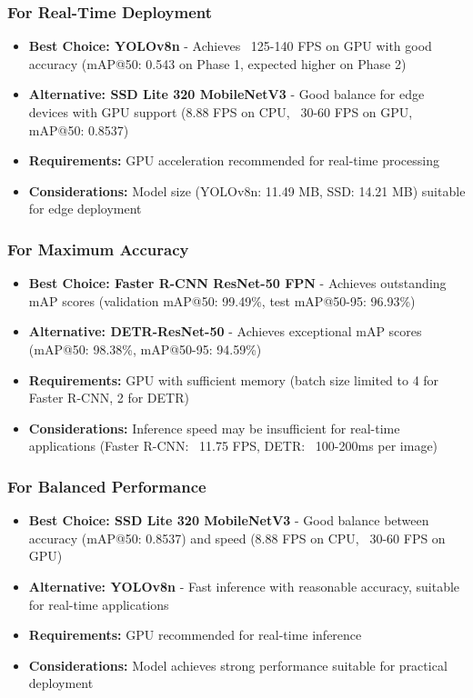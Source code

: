 \documentclass[12pt,a4paper]{article}
\begin{document}
\subsubsection{For Real-Time Deployment}

\begin{itemize}
    \item \textbf{Best Choice: YOLOv8n} - Achieves ~125-140 FPS on GPU with good accuracy (mAP@50: 0.543 on Phase 1, expected higher on Phase 2)
    \item \textbf{Alternative: SSD Lite 320 MobileNetV3} - Good balance for edge devices with GPU support (8.88 FPS on CPU, ~30-60 FPS on GPU, mAP@50: 0.8537)
    \item \textbf{Requirements:} GPU acceleration recommended for real-time processing
    \item \textbf{Considerations:} Model size (YOLOv8n: 11.49 MB, SSD: 14.21 MB) suitable for edge deployment
\end{itemize}

\subsubsection{For Maximum Accuracy}

\begin{itemize}
    \item \textbf{Best Choice: Faster R-CNN ResNet-50 FPN} - Achieves outstanding mAP scores (validation mAP@50: 99.49\%, test mAP@50-95: 96.93\%)
    \item \textbf{Alternative: DETR-ResNet-50} - Achieves exceptional mAP scores (mAP@50: 98.38\%, mAP@50-95: 94.59\%)
    \item \textbf{Requirements:} GPU with sufficient memory (batch size limited to 4 for Faster R-CNN, 2 for DETR)
    \item \textbf{Considerations:} Inference speed may be insufficient for real-time applications (Faster R-CNN: ~11.75 FPS, DETR: ~100-200ms per image)
\end{itemize}

\subsubsection{For Balanced Performance}

\begin{itemize}
    \item \textbf{Best Choice: SSD Lite 320 MobileNetV3} - Good balance between accuracy (mAP@50: 0.8537) and speed (8.88 FPS on CPU, ~30-60 FPS on GPU)
    \item \textbf{Alternative: YOLOv8n} - Fast inference with reasonable accuracy, suitable for real-time applications
    \item \textbf{Requirements:} GPU recommended for real-time inference
    \item \textbf{Considerations:} Model achieves strong performance suitable for practical deployment
\end{itemize}
\end{document}
